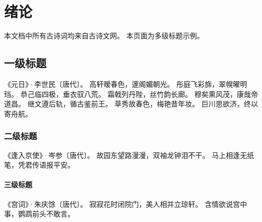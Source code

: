\chapter{绪论}

本文档中所有古诗词均来自古诗文网\cite{poemonline}。
本页面为多级标题示例。

\section{一级标题}
\thispagestyle{fancy}   %

《元日》·李世民〔唐代〕。
高轩暧春色，邃阁媚朝光。
彤庭飞彩旆，翠幌曜明珰。
恭己临四极，垂衣驭八荒。
霜戟列丹陛，丝竹韵长廊。
穆矣熏风茂，康哉帝道昌。
继文遵后轨，循古鉴前王。
草秀故春色，梅艳昔年妆。
巨川思欲济，终以寄舟航。

\subsection{二级标题}

《逢入京使》·岑参〔唐代〕。
故园东望路漫漫，双袖龙钟泪不干。
马上相逢无纸笔，凭君传语报平安。

\subsubsection{三级标题}

《宫词》·朱庆馀〔唐代〕。
寂寂花时闭院门，美人相并立琼轩。
含情欲说宫中事，鹦鹉前头不敢言。
\newpage